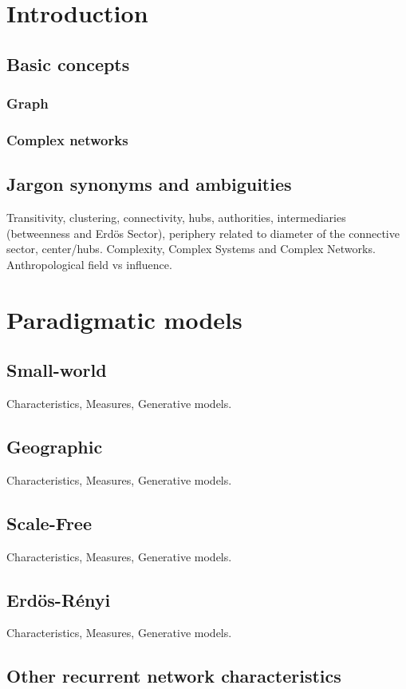 \documentclass[%
 aip,
 jmp,%
 amsmath,amssymb,
 reprint,%
]{revtex4-1}
\begin{document}
\section{\label{sec:intro}Introduction}
\subsection{Basic concepts}
\subsubsection{Graph}
\subsubsection{Complex networks}
\subsection{Jargon synonyms and ambiguities}
Transitivity, clustering, connectivity, hubs, authorities, intermediaries (betweenness and Erd\"os Sector), periphery related to diameter of the connective sector, center/hubs. Complexity, Complex Systems and Complex Networks. Anthropological field vs influence.

\section{\label{sec:models}Paradigmatic models}
\subsection{Small-world}
Characteristics, Measures, Generative models.
\subsection{Geographic}
Characteristics, Measures, Generative models.
\subsection{Scale-Free}
Characteristics, Measures, Generative models.
\subsection{Erd\"os-R\'enyi}
Characteristics, Measures, Generative models.
\subsection{Other recurrent network characteristics}
\end{document}
